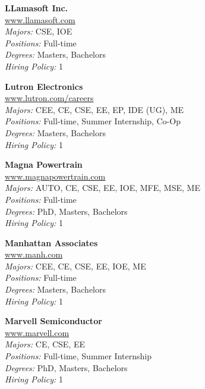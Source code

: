 \documentclass[twoside]{article}
\begin{document}
\begin{center}
\begin{multicols}{3}
\begin{minipage}{.9\columnwidth}{\Large\bf LLamasoft Inc. }\\
	\url{www.llamasoft.com}\\
	\emph{Majors:} CSE, IOE\\
	\emph{Positions:} Full-time\\
	\emph{Degrees:} Masters, Bachelors\\
	\emph{Hiring Policy:} 1\\
\end{minipage}
 
\begin{minipage}{.9\columnwidth}{\Large\bf Lutron Electronics }\\
	\url{www.lutron.com/careers}\\
	\emph{Majors:} CEE, CE, CSE, EE, EP, IDE (UG), ME\\
	\emph{Positions:} Full-time, Summer Internship, Co-Op\\
	\emph{Degrees:} Masters, Bachelors\\
	\emph{Hiring Policy:} 1\\
\end{minipage}
 
\begin{minipage}{.9\columnwidth}{\Large\bf Magna Powertrain }\\
	\url{www.magnapowertrain.com}\\
	\emph{Majors:} AUTO, CE, CSE, EE, IOE, MFE, MSE, ME\\
	\emph{Positions:} Full-time\\
	\emph{Degrees:} PhD, Masters, Bachelors\\
	\emph{Hiring Policy:} 1\\
\end{minipage}
 
\begin{minipage}{.9\columnwidth}{\Large\bf Manhattan Associates }\\
	\url{www.manh.com}\\
	\emph{Majors:} CEE, CE, CSE, EE, IOE, ME\\
	\emph{Positions:} Full-time\\
	\emph{Degrees:} Masters, Bachelors\\
	\emph{Hiring Policy:} 1\\
\end{minipage}
 
\begin{minipage}{.9\columnwidth}{\Large\bf Marvell Semiconductor }\\
	\url{www.marvell.com}\\
	\emph{Majors:} CE, CSE, EE\\
	\emph{Positions:} Full-time, Summer Internship\\
	\emph{Degrees:} PhD, Masters, Bachelors\\
	\emph{Hiring Policy:} 1\\
\end{minipage}
 

\end{multicols}
\end{center}
\end{document}
